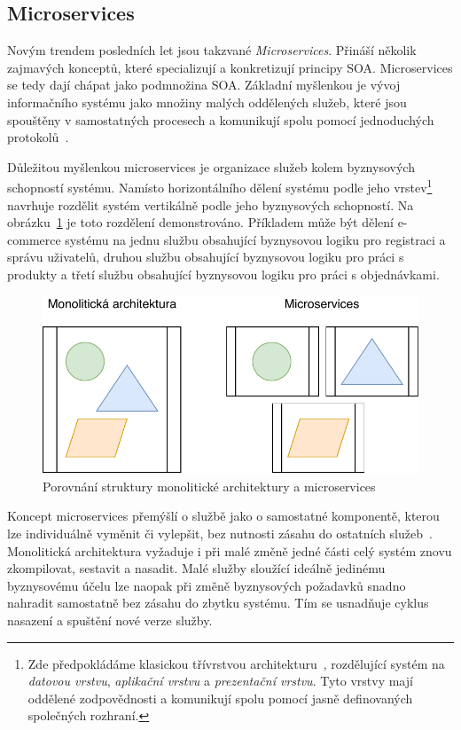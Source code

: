 \subsection{Microservices}

Novým trendem posledních let jsou takzvané \textit{Microservices}.
Přináší několik zajmavých konceptů, které specializují a konkretizují
principy \gls{SOA}. Microservices se tedy dají chápat jako podmnožina
\gls{SOA}. Základní myšlenkou je vývoj informačního systému jako množiny
malých oddělených služeb, které jsou spouštěny v samostatných procesech
a komunikují spolu pomocí jednoduchých protokolů~\cite{lewis2014microservices}.

Důležitou myšlenkou microservices je organizace služeb kolem
byznysových schopností systému. Namísto horizontálního dělení systému
podle jeho vrstev\footnote{
Zde předpokládáme klasickou třívrstvou architekturu~\cite{fowler2002patterns},
rozdělující systém na \textit{datovou vrstvu}, \textit{aplikační vrstvu}
a \textit{prezentační vrstvu}. Tyto vrstvy mají oddělené zodpovědnosti a komunikují
spolu pomocí jasně definovaných společných rozhraní.
} navrhuje rozdělit systém vertikálně podle jeho byznysových schopností.
Na obrázku~\ref{fig:monolith-vs-microservices} je toto rozdělení demonstrováno.
Příkladem může být dělení e-commerce systému na jednu službu obsahující byznysovou
logiku pro registraci a správu uživatelů, druhou službu obsahující byznysovou logiku
pro práci s produkty a třetí službu obsahující byznysovou logiku pro práci
s objednávkami.

\begin{figure}
    \centering
    \includegraphics[keepaspectratio=true, width=0.5\linewidth]{figures/monolith-vs-microservices.pdf}
    \caption{Porovnání struktury monolitické architektury a microservices}
    \label{fig:monolith-vs-microservices}
\end{figure}

Koncept microservices přemýšlí o službě jako o samostatné komponentě,
kterou lze individuálně vyměnit či vylepšit, bez nutnosti zásahu do
ostatních služeb~\cite{lewis2014microservices}. Monolitická architektura
vyžaduje i při malé změně jedné části celý systém znovu zkompilovat, sestavit
a nasadit. Malé služby sloužící ideálně jedinému byznysovému účelu lze naopak
při změně byznysových požadavků snadno nahradit samostatně bez zásahu do zbytku
systému. Tím se usnadňuje cyklus nasazení a spuštění nové verze služby.

